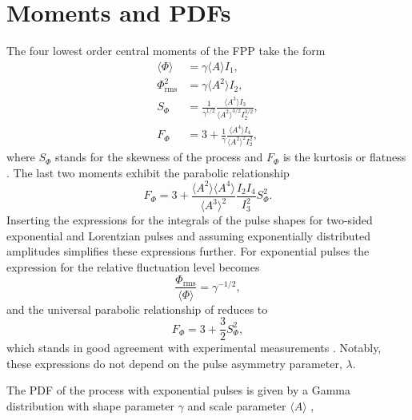 \section{Moments and PDFs}
The four lowest order central moments of the FPP take the form 
\begin{subequations}
	\begin{align}
		\langle\Phi\rangle  &= \gamma \langle A \rangle I_1,\\
		\Phi^2_\mathrm{rms} &= \gamma \langle A^2\rangle I_2,\\
		S_\Phi &= \frac{1}{\gamma^{1/2}}\frac{\langle A^3\rangle I_3}{\langle A^2\rangle^{3/2} I_2^{3/2} },\\
		F_\Phi &= 3 + \frac{1}{\gamma} \frac{\langle A^4\rangle I_4}{\langle A^2\rangle^2 I_2^2}, 
	\end{align}
\end{subequations}
where $S_\Phi$ stands for the skewness of the process and $F_\Phi$ is the kurtosis or flatness \cite{garcia2012stochastic}. The last two moments exhibit the parabolic relationship 
\begin{equation}\label{parabolic}
	F_\Phi = 3 + \frac{\langle A^2\rangle \langle A^4\rangle}{\langle A^3\rangle^2}\frac{I_2 I_4}{I^2_3} S_\Phi^2.
\end{equation}
Inserting the expressions for the integrals of the pulse shapes for two-sided exponential and Lorentzian pulses and assuming exponentially distributed amplitudes simplifies these expressions further. For exponential pulses the expression for the relative fluctuation level becomes
\begin{equation}
	\frac{\Phi_{\mathrm{rms}}}{\langle \Phi\rangle} = \gamma^{-1/2},
\end{equation}
and the universal parabolic relationship of  reduces to
\begin{equation}
	F_\Phi = 3 + \frac{3}{2} S_\Phi^2,
\end{equation} 
which stands in good agreement with experimental measurements \cite{labit2007universal,sattin2009statistics,sattin2009parabolic}. Notably, these expressions do not depend on the pulse asymmetry parameter, $\lambda$. 

The PDF of the process with exponential pulses is given by a Gamma distribution with shape parameter $\gamma$ and scale parameter $\langle A \rangle$ \cite{theodorsen2018probability},

